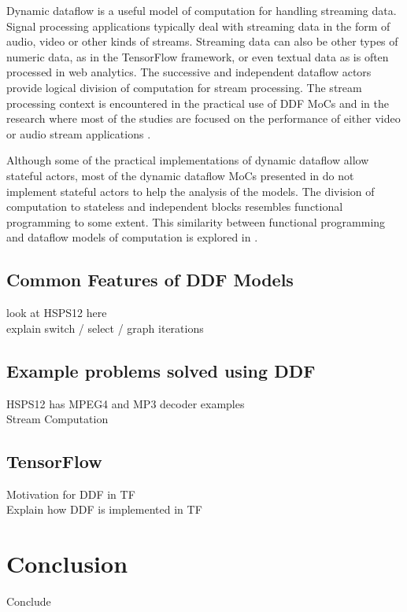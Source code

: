 \documentclass[conference,a4paper]{IEEEtran}
\begin{document}
Dynamic dataflow is a useful model of computation for handling streaming data.
Signal processing applications typically deal with streaming data in the form of
audio, video or other kinds of streams. Streaming data can also be other types
of numeric data, as in the TensorFlow framework, or even textual data as is
often processed in web analytics. The successive and independent dataflow actors
provide logical division of computation for stream processing. The stream
processing context is encountered in the practical use of DDF MoCs
\cite{eker2003cal, tensorflow2015-whitepaper} and in the research where most of
the studies are focused on the performance of either video or audio stream
applications \cite{bhattacharyya2013handbook, roquier2008automatic,
ersfolk2014scheduling}.

Although some of the practical implementations of dynamic dataflow
\cite{tensorflow2015-whitepaper, eker2003cal} allow stateful actors, most of the
dynamic dataflow MoCs presented in \cite{bhattacharyya2013handbook} do not
implement stateful actors to help the analysis of the models. The division of
computation to stateless and independent blocks resembles functional programming
to some extent. This similarity between functional programming and dataflow
models of computation is explored in \cite{reekie1995realtime}.

\subsection{Common Features of DDF Models}
look at HSPS12 here \\
explain switch / select / graph iterations \\

\subsection{Example problems solved using DDF}
HSPS12 has MPEG4 and MP3 decoder examples \\
Stream Computation \\

\subsection{TensorFlow}
Motivation for DDF in TF \\
Explain how DDF is implemented in TF \\

\section{Conclusion}
Conclude \\
\end{document}
